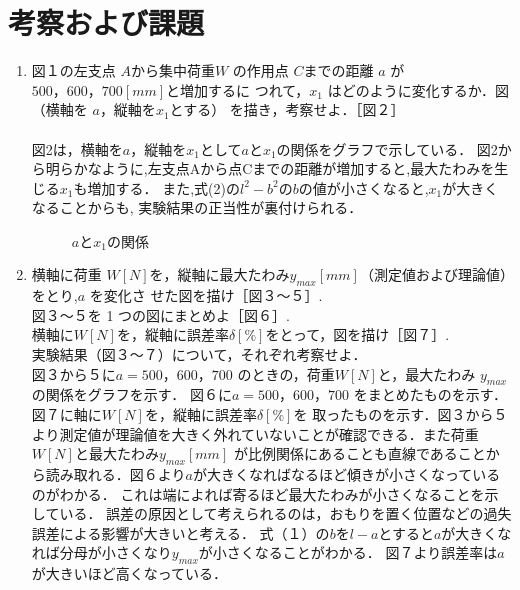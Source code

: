 \documentclass[a4paper,11pt]{jsarticle}
\begin{document}
\section{考察および課題}
\begin{enumerate}
  \item 図１の左支点 $A$から集中荷重$ W$ の作用点 $C $までの距離 $a$ が $500，600，700 [mm]$と増加するに
  つれて，$x_1$ はどのように変化するか．図（横軸を $a $，縦軸を$x_1$とする） を描き，考察せよ．［図２］\\
  \\
  \quad 図2は，横軸を$a$，縦軸を$x_1$として$a$と$x_1$の関係をグラフで示している．
  図2から明らかなように,左支点Aから点Cまでの距離が増加すると,最大たわみを生じる$x_1$も増加する．
  また,式(2)の$l^2-b^2$の$b$の値が小さくなると,$x_1$が大きくなることからも,
  実験結果の正当性が裏付けられる．
\clearpage
\begin{figure}[h]
  \centering
  \caption{$a$と$x_1$の関係}
\end{figure}
\clearpage
\item 横軸に荷重 $W [N] $を，縦軸に最大たわみ$ y_{max}[mm]$（測定値および理論値）をとり,$a$ を変化さ
せた図を描け［図３～５］.\\
図３～５を 1 つの図にまとめよ［図６］.\\
横軸に$ W [N]$を，縦軸に誤差率$ \delta [\%]$をとって，図を描け［図７］.\\
実験結果（図３～７）について，それぞれ考察せよ．\\
  
\quad 図３から５に$a = 500，600，700$ のときの，荷重$ W [N] $と，最大たわみ $y_{max}$の関係をグラフを示す．
図６に$a = 500，600，700$ をまとめたものを示す．図７に軸に$ W [N]$を，縦軸に誤差率$ \delta [\%]$を
取ったものを示す．図３から５より測定値が理論値を大きく外れていないことが確認できる．また荷重 $W [N] $と最大たわみ$ y_{max}[mm]$
が比例関係にあることも直線であることから読み取れる．図６より$a$が大きくなればなるほど傾きが小さくなっているのがわかる．
これは端によれば寄るほど最大たわみが小さくなることを示している．
誤差の原因として考えられるのは，おもりを置く位置などの過失誤差による影響が大きいと考える．
式（１）の$b$を$l-a$とすると$a$が大きくなれば分母が小さくなり$y_{max}$が小さくなることがわかる．
図７より誤差率は$a$が大きいほど高くなっている．


\end{enumerate}
\end{document}
